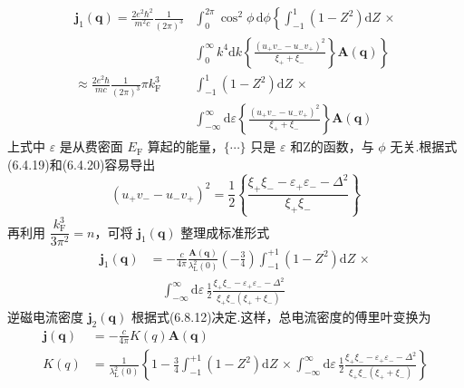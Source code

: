\begin{equation*}
\begin{aligned}
  \boldsymbol{j}_{1}(\boldsymbol{q})
  =\frac{2e^{2}\hbar^{2}}{m^{2}c}\frac{1}{(2\pi)^{3}}
  &\int_{0}^{2\pi}\cos^{2}\phi\,\mathrm{d}\phi
  \left\{\int_{-1}^{1}\left(1-Z^{2}\right)\mathrm{d}Z\,\times\right.\\
  &\left.\int_{0}^{\infty}k^{4}\mathrm{d}k
  \left\{\frac{\left(u_{+}v_{-}-u_{-}v_{+}\right)^{2}}
  {\xi_{+}+\xi_{-}}\right\}\boldsymbol{A}(\boldsymbol{q})\right\}\\
  \approx\frac{2e^{2}\hbar}{mc}\frac{1}{(2\pi)^{3}}\pi k_{\mathrm{F}}^{3}
  &\int_{-1}^{1}\left(1-Z^{2}\right)\mathrm{d}Z\,\times\\
  &\int_{-\infty}^{\infty}\mathrm{d}\varepsilon
  \left\{\frac{\left(u_{+}v_{-}-u_{-}v_{+}\right)^{2}}
  {\xi_{+}+\xi_{-}}\right\}\boldsymbol{A}(\boldsymbol{q})
\end{aligned}
\end{equation*}
上式中 $\varepsilon$ 是从费密面 $E_{\mathrm{F}}$ 算起的能量，$\{\cdots\}$ 只是 $\varepsilon$ 和Z的函数，与 $\phi$ 无关.根据式(6.4.19)和(6.4.20)容易导出
\begin{equation}
  \left(u_{+}v_{-}-u_{-}v_{+}\right)^{2}
  =\frac{1}{2}\left\{\frac{\xi_{+}\xi_{-}
  -\varepsilon_{+}\varepsilon_{-}-\Delta^{2}}{\xi_{+}\xi_{-}}\right\}
\end{equation}
再利用 $\dfrac{k_{\mathrm{F}}^{3}}{3\pi^{2}}=n$，可将 $\boldsymbol{j}_{1}(\boldsymbol{q})$ 整理成标准形式
\begin{equation}
\begin{aligned}
  \boldsymbol{j}_{1}(\boldsymbol{q})
  &=-\frac{c}{4\pi}\frac{\boldsymbol{A}(\boldsymbol{q})}{\lambda_{\mathrm{L}}^{2}(0)}
  \left(-\frac{3}{4}\right)\int_{-1}^{+1}\left(1-Z^{2}\right)\mathrm{d}Z\,\times\\
  &\quad\int_{-\infty}^{\infty}\mathrm{d}\varepsilon\,
  \frac{1}{2}\frac{\xi_{+}\xi_{-}-\varepsilon_{+}\varepsilon_{-}-\Delta^{2}}
  {\xi_{+}\xi_{-}\left(\xi_{+}+\xi_{-}\right)}
\end{aligned}
\end{equation}
逆磁电流密度 $\boldsymbol{j}_{2}(\boldsymbol{q})$ 根据式(6.8.12)决定.这样，总电流密度的傅里叶变换为
\begin{equation}
\begin{aligned}
  \boldsymbol{j}(\boldsymbol{q})&=-\frac{c}{4\pi}K(q)\boldsymbol{A}(\boldsymbol{q})\\
  K(q)&=\frac{1}{\lambda_{\mathrm{L}}^{2}(0)}\left\{1-\frac{3}{4}
  \int_{-1}^{+1}\left(1-Z^{2}\right)\mathrm{d}Z\,\times
  \int_{-\infty}^{\infty}\mathrm{d}\varepsilon\,
  \frac{1}{2}\frac{\xi_{+}\xi_{-}-\varepsilon_{+}\varepsilon_{-}-\Delta^{2}}
  {\xi_{+}\xi_{-}\left(\xi_{+}+\xi_{-}\right)}\right\}
\end{aligned}
\end{equation}
